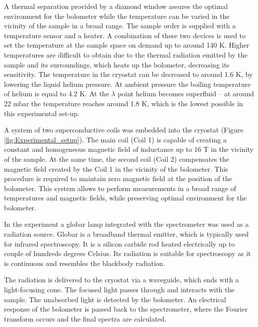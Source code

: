 \documentclass[titlepage,a4paper]{book}
\begin{document}
A thermal separation provided by a diamond window assures the optimal environment for the bolometer while the temperature can be varied in the vicinity of the sample in a broad range. The sample order is supplied with a temperature sensor and a heater. A combination of these two devices is used to set the temperature at the sample space on demand up to around 140 K. Higher temperatures are difficult to obtain due to the thermal radiation emitted by the sample and its surroundings, which heats up the bolometer, decreasing its sensitivity. The temperature in the cryostat can be decreased to around 1.6 K, by lowering the liquid helium pressure. At ambient pressure the boiling temperature of helium is equal to 4.2 K. At the $\lambda$ point helium becomes superfluid -- at around 22 mbar the temperature reaches around 1.8 K, which is the lowest possible in this experimental set-up.

A system of two superconductive coils was embedded into the cryostat (Figure \ref{fig:Experimental_setup}). The main coil (Coil 1) is capable of creating a constant and homogeneous magnetic field of inductance up to 16 T in the vicinity of the sample. At the same time, the second coil (Coil 2) compensates the magnetic field created by the Coil 1 in the vicinity of the bolometer. This procedure is required to maintain zero magnetic field at the position of the bolometer. This system allows to perform measurements in a broad range of temperatures and magnetic fields, while preserving optimal environment for the bolometer.

In the experiment a globar lamp integrated with the spectrometer was used as a radiation source. Globar is a broadband thermal emitter, which is typically used for infrared spectroscopy. It is a silicon carbide rod heated electrically up to couple of hundreds degrees Celsius. Its radiation is suitable for spectroscopy as it is continuous and resembles the blackbody radiation.

The radiation is delivered to the cryostat via a waveguide, which ends with a light-focusing cone. The focused light passes through and interacts with the sample. The unabsorbed light is detected by the bolometer. An electrical response of the bolometer is passed back to the spectrometer, where the Fourier transform occurs and the final spectra are calculated.
\end{document}
